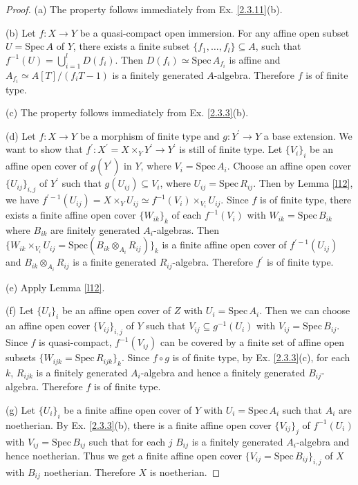 \begin{proof}
	(a) The property follows immediately from Ex. \ref{2.3.11}(b).
	
	(b) Let $f:X\to Y$ be a quasi-compact open immersion. For any affine open subset $U=\mathrm{Spec}\,A$ of $Y$, there exists a finite subset $\{f_1,\dots,f_l\}\subseteq A$, such that $f^{-1}(U)=\bigcup_{i=1}^lD(f_i)$. Then $D(f_i)\simeq\mathrm{Spec}\,A_{f_i}$ is affine and $A_{f_i}\simeq A[T]/(f_iT-1)$ is a finitely generated $A$-algebra. Therefore $f$ is of finite type.
	
	(c) The property follows immediately from Ex. \ref{2.3.3}(b).
	
	(d) Let $f:X\to Y$ be a morphism of finite type and $g:Y^{\prime}\to Y$ a base extension. We want to show that $f^{\prime}:X^{\prime}=X\times_YY^{\prime}\to Y^{\prime}$ is still of finite type. Let $\{V_i\}_i$ be an affine open cover of $g(Y^{\prime})$ in $Y$, where $V_i=\mathrm{Spec}\,A_i$. Choose an affine open cover $\{U_{ij}\}_{i,j}$ of $Y^{\prime}$ such that $g(U_{ij})\subseteq V_i$, where $U_{ij}=\mathrm{Spec}\,R_{ij}$. Then by Lemma \ref{l12}, we have $f^{\prime-1}(U_{ij})=X\times_YU_{ij}\simeq f^{-1}(V_i)\times_{V_i}U_{ij}$. Since $f$ is of finite type, there exists a finite affine open cover $\{W_{ik}\}_k$ of each $f^{-1}(V_i)$ with $W_{ik}=\mathrm{Spec}\,B_{ik}$ where $B_{ik}$ are finitely generated $A_i$-algebras. Then $\{W_{ik}\times_{V_i}U_{ij}=\mathrm{Spec}(B_{ik}\otimes_{A_i}R_{ij})\}_k$ is a finite affine open cover of $f^{\prime-1}(U_{ij})$ and $B_{ik}\otimes_{A_i}R_{ij}$ is a finite generated $R_{ij}$-algebra. Therefore $f^{\prime}$ is of finite type.
	
	(e) Apply Lemma \ref{l12}.
	
	(f) Let $\{U_i\}_i$ be an affine open cover of $Z$ with $U_i=\mathrm{Spec}\,A_i$. Then we can choose an affine open cover $\{V_{ij}\}_{i,j}$ of $Y$ such that $V_{ij}\subseteq g^{-1}(U_i)$ with $V_{ij}=\mathrm{Spec}\,B_{ij}$. Since $f$ is quasi-compact, $f^{-1}(V_{ij})$ can be covered by a finite set of affine open subsets $\{W_{ijk}=\mathrm{Spec}\,R_{ijk}\}_k$. Since $f\circ g$ is of finite type, by Ex. \ref{2.3.3}(c), for each $k$, $R_{ijk}$ is a finitely generated $A_i$-algebra and hence a finitely generated $B_{ij}$-algebra. Therefore $f$  is of finite type.
	
	(g) Let $\{U_i\}_i$ be a finite affine open cover of $Y$ with $U_i=\mathrm{Spec}\,A_i$ such that $A_i$ are noetherian. By Ex. \ref{2.3.3}(b), there is a finite affine open cover $\{V_{ij}\}_j$ of $f^{-1}(U_i)$ with $V_{ij}=\mathrm{Spec}\,B_{ij}$ such that for each $j$  $B_{ij}$ is a finitely generated $A_i$-algebra and hence noetherian. Thus we get a finite affine open cover $\{V_{ij}=\mathrm{Spec}\,B_{ij}\}_{i,j}$ of $X$ with $B_{ij}$ noetherian. Therefore $X$ is noetherian.
\end{proof}
